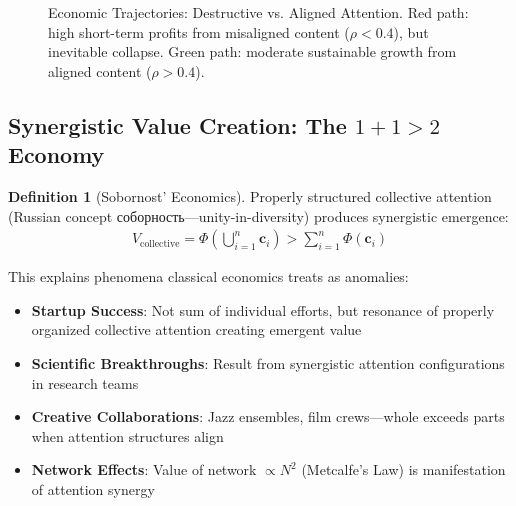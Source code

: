 \documentclass[11pt,a4paper]{article}
\theoremstyle{definition}
\newtheorem{definition}{Definition}[section]
\theoremstyle{remark}
\newcommand{\cc}{\mathbf{c}}
\begin{document}
\begin{small}
\begin{figure}[H]
\caption{Economic Trajectories: Destructive vs. Aligned Attention. Red path: high short-term profits from misaligned content (\(\rho < 0.4\)), but inevitable collapse. Green path: moderate sustainable growth from aligned content (\(\rho > 0.4\)).}
\label{fig:economic_trajectories}
\end{figure}

\subsection{Synergistic Value Creation: The \(1+1>2\) Economy}

\begin{definition}[Sobornost' Economics]
Properly structured collective attention (Russian concept соборность—unity-in-diversity) produces synergistic emergence:
\begin{align}
V_{\text{collective}} = \Phi\left(\bigcup_{i=1}^n \cc_i\right) > \sum_{i=1}^n \Phi(\cc_i)
\end{align}

This explains phenomena classical economics treats as anomalies:
\begin{itemize}
\item \textbf{Startup Success}: Not sum of individual efforts, but resonance of properly organized collective attention creating emergent value
\item \textbf{Scientific Breakthroughs}: Result from synergistic attention configurations in research teams
\item \textbf{Creative Collaborations}: Jazz ensembles, film crews—whole exceeds parts when attention structures align
\item \textbf{Network Effects}: Value of network \(\propto N^2\) (Metcalfe's Law) is manifestation of attention synergy
\end{itemize}
\end{definition}


\end{small}
\end{document}
